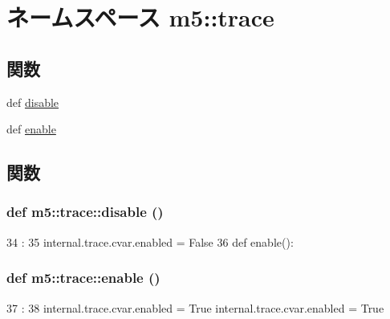 \hypertarget{namespacem5_1_1trace}{
\section{ネームスペース m5::trace}
\label{namespacem5_1_1trace}
}
\subsection*{関数}
\begin{DoxyCompactItemize}
\item 
def \hyperlink{namespacem5_1_1trace_a32cf76ee56898a4bf2e48e3d7b757679}{disable}
\item 
def \hyperlink{namespacem5_1_1trace_af931eefa457772290c018eff29ef1bea}{enable}
\end{DoxyCompactItemize}


\subsection{関数}
\hypertarget{namespacem5_1_1trace_a32cf76ee56898a4bf2e48e3d7b757679}{
\subsubsection[{disable}]{\setlength{\rightskip}{0pt plus 5cm}def m5::trace::disable ()}}
\label{namespacem5_1_1trace_a32cf76ee56898a4bf2e48e3d7b757679}



\begin{DoxyCode}
34              :
35     internal.trace.cvar.enabled = False
36 
def enable():
\end{DoxyCode}
\hypertarget{namespacem5_1_1trace_af931eefa457772290c018eff29ef1bea}{
\subsubsection[{enable}]{\setlength{\rightskip}{0pt plus 5cm}def m5::trace::enable ()}}
\label{namespacem5_1_1trace_af931eefa457772290c018eff29ef1bea}



\begin{DoxyCode}
37             :
38     internal.trace.cvar.enabled = True
    internal.trace.cvar.enabled = True
\end{DoxyCode}
